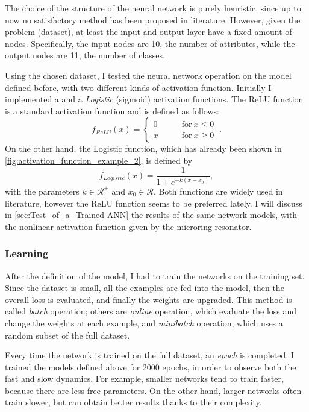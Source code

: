 The choice of the structure of the neural network is purely heuristic, since up to now no satisfactory method has been proposed in literature.
However, given the problem (dataset), at least the input and output layer have a fixed amount of nodes.
Specifically, the input nodes are \num{10}, the number of attributes, while the output nodes are \num{11}, the number of classes.

Using the chosen dataset, I tested the neural network operation on the model defined before, with two different kinds of activation function.
Initially I implemented a  and a \textit{Logistic} (sigmoid) activation functions.
The \acs{ReLU} function is a standard activation function and is defined as follows:
\begin{equation}
f_{ReLU}(x) =
\begin{cases}
	0 & \qquad \mathrm{for}~ x\leq 0\\
	x & \qquad \mathrm{for}~ x\geq 0
\end{cases}~.
\label{eq:relu}
\end{equation}
On the other hand, the Logistic function, which has already been shown in \autoref{fig:activation_function_example_2}, is defined by
\begin{equation}
f_{Logistic}(x) = \frac{1}{1+e^{-k\left(x-x_0\right)}},
\end{equation}
with the parameters $k\in \mathcal{R}^+$ and $x_0\in \mathcal{R}$.
Both functions are widely used in literature, however the \acs{ReLU} function seems to be preferred lately.
I will discuss in \autoref{sec:Test_of_a_Trained ANN} the results of the same network models, with the nonlinear activation function given by the microring resonator.

\subsubsection{Learning}
After the definition of the model, I had to train the networks on the training set.
Since the dataset is small, all the examples are fed into the model, then the overall loss is evaluated, and finally the weights are upgraded.
This method is called \textit{batch} operation; others are \textit{online} operation, which evaluate the loss and change the weights at each example, and \textit{minibatch} operation, which uses a random subset of the full dataset.

Every time the network is trained on the full dataset, an \textit{epoch} is completed.
I trained the models defined above for \num{2000} epochs, in order to observe both the fast and slow dynamics.
For example, smaller networks tend to train faster, because there are less free parameters.
On the other hand, larger networks often train slower, but can obtain better results thanks to their complexity.

